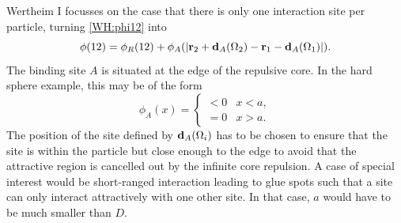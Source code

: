 \documentclass[8.5pt,twoside,twocolumn]{article}
\renewcommand\r{\bo r}
\theoremstyle{standard}
\begin{document}
Wertheim I focusses on the case that there is only one interaction site per particle, turning
\eqref{WH:phi12} into
\begin{equation}
\phi(12)=\phi_R(12) + \phi_A(\abs{\r_2+\bo d_A(\Om_2)-\r_1-\bo d_A(\Om_1)}).
\label{WH:phi12_OneSite}
\end{equation}
The binding site $A$ is situated at the edge of the repulsive core. In the hard sphere example,
this may be of the form
\begin{equation}
\phi_A(x)=\begin{cases}
<0 &x<a,\\
=0 &x>a.
\end{cases}
\end{equation}
The position of the site defined by $\mathbf{d}_A(\Omega_i)$ has to be chosen to ensure
that the site is within the particle but close enough to the edge to avoid that
the attractive region is cancelled out by the infinite core repulsion. A case of
special interest would be short-ranged interaction leading to glue spots such
that a site can only interact attractively with one other site. In that case,
$a$ would have to be much smaller than $D$.
\end{document}
